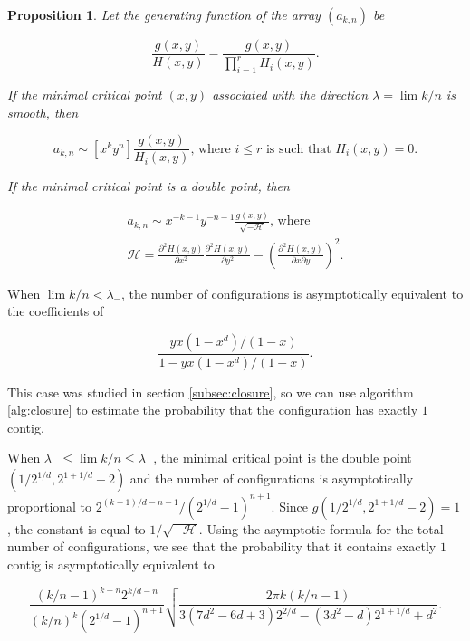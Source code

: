 \documentclass{article}
\newtheorem{proposition}{Proposition}
\begin{document}
\begin{proposition}
Let the generating function of the array $(a_{k,n})$ be

\begin{equation*}
\frac{g(x,y)}{H(x,y)} =
\frac{g(x,y)}{\prod_{i=1}^rH_i(x,y)}.
\end{equation*}

If the minimal critical point $(x,y)$ associated with the direction
$\lambda = \lim k/n$ is smooth, then

\begin{equation*}
a_{k,n} \sim [x^ky^n] \frac{g(x,y)}{H_i(x,y)}\text{, where $i \leq r$ is
such that } H_i(x,y) = 0.
\end{equation*}

If the minimal critical point is a double point, then

\begin{equation*}
\begin{split}
a_{k,n} \sim x^{-k-1}y^{-n-1} \frac{g(x,y)}{\sqrt{-\mathcal{H}}}
\text{, where} \\
\mathcal{H} = \frac{\partial^2H(x,y)}{\partial x^2}
  \frac{\partial^2H(x,y)}{\partial y^2} -
\left( \frac{\partial^2H(x,y)}{\partial x\partial y} \right)^2.
\end{split}
\end{equation*}
\end{proposition}

When $\lim k/n < \lambda_-$, the number of configurations is
asymptotically equivalent to the coefficients of

\begin{equation*}
\frac{yx(1-x^d)/(1-x)}{1-yx(1-x^d)/(1-x)}.
\end{equation*}

This case was studied in section \ref{subsec:closure}, so we can use
algorithm \ref{alg:closure} to estimate the probability that the
configuration has exactly $1$ contig.

When $\lambda_- \leq \lim k/n \leq \lambda_+$, the minimal critical point
is the double point $\left( 1/2^{1/d}, 2^{1+1/d}-2 \right)$ and the number
of configurations is asymptotically proportional to
$2^{(k+1)/d-n-1}/(2^{1/d}-1)^{n+1}$. Since $g(1/2^{1/d}, 2^{1+1/d}-2) =
1$, the constant is equal to $1/\sqrt{-\mathcal{H}}$. Using the asymptotic
formula for the total number of configurations, we see that the
probability that it contains exactly $1$ contig is asymptotically
equivalent to

\begin{equation*}
\frac{(k/n-1)^{k-n}2^{k/d-n}}{(k/n)^k(2^{1/d}-1)^{n+1}}
\sqrt{\frac{2\pi k(k/n-1)}{3(7d^2-6d+3)2^{2/d} -(3d^2-d)2^{1+1/d} + d^2}}.
\end{equation*}
\end{document}
